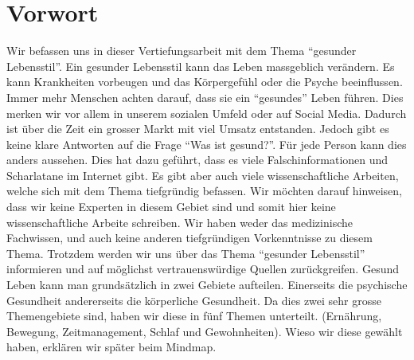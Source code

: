 \chapter{Vorwort}
\authortoc{\dario}{\chapterident}
Wir befassen uns in dieser Vertiefungsarbeit mit dem Thema “gesunder Lebensstil”.
\newline
Ein gesunder Lebensstil kann das Leben massgeblich verändern. Es kann Krankheiten vorbeugen und das Körpergefühl oder die Psyche beeinflussen.
\newline
Immer mehr Menschen achten darauf, dass sie ein “gesundes” Leben führen. Dies merken wir vor allem in unserem sozialen Umfeld oder auf Social Media.
\newline
Dadurch ist über die Zeit ein grosser Markt mit viel Umsatz entstanden.
\newline
Jedoch gibt es keine klare Antworten auf die Frage “Was ist gesund?”. Für jede Person kann dies anders aussehen. 
\newline
Dies hat dazu geführt, dass es viele Falschinformationen und Scharlatane im Internet gibt.
\newline
Es gibt aber auch viele wissenschaftliche Arbeiten, welche sich mit dem Thema tiefgründig befassen.
\newline
Wir möchten darauf hinweisen, dass wir keine Experten in diesem Gebiet sind und somit hier keine wissenschaftliche Arbeite schreiben. Wir haben weder das medizinische Fachwissen, und auch keine anderen tiefgründigen Vorkenntnisse zu diesem Thema.
\newline
Trotzdem werden wir uns über das Thema “gesunder Lebensstil” informieren und auf möglichst vertrauenswürdige Quellen zurückgreifen.
\newline
Gesund Leben kann man grundsätzlich in zwei Gebiete aufteilen. Einerseits die psychische Gesundheit andererseits die körperliche Gesundheit. Da dies zwei sehr grosse Themengebiete sind, haben wir diese in fünf Themen unterteilt.
\newline
(Ernährung, Bewegung, Zeitmanagement, Schlaf und Gewohnheiten). Wieso wir diese gewählt haben, erklären wir später beim Mindmap.